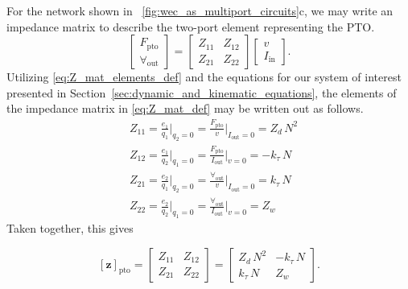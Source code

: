 \documentclass[lettersize,journal]{IEEEtran}
\begin{document}
For the network shown in \figurename~\ref{fig:wec_as_multiport_circuits}c, we may write an impedance matrix to describe the two-port element representing the PTO.
%
\begin{equation}
        \label{eq:Z_mat_def}
        \begin{bmatrix} 
                F_{\textrm{pto}} \\
                \forall_{\textrm{out}} 
        \end{bmatrix} 
        = 
        \begin{bmatrix} 
                Z_{11} & Z_{12} \\ 
                Z_{21} & Z_{22} 
        \end{bmatrix} 
        \begin{bmatrix} 
                v \\
                I_{\textrm{in}} 
        \end{bmatrix} .
\end{equation}
%
 Utilizing \eqref{eq:Z_mat_elements_def} and the equations for our system of interest presented in Section~\ref{sec:dynamic_and_kinematic_equations}, the elements of the impedance matrix in \eqref{eq:Z_mat_def} may be written out as follows.
%
\begin{subequations}
        \begin{align}
                &Z_{11} = \frac{e_1}{q_1} \bigg \vert_{q_2=0} 
                = \frac{F_{\textrm{pto}}}{v} \bigg \vert_{I_{\textrm{out}}=0} = Z_d \, N^2 \\[0.5em]
                &Z_{12} = \frac{e_1}{q_2} \bigg \vert_{q_1=0} 
                = \frac{F_{\textrm{pto}}}{I_{\textrm{out}}} \bigg \vert_{v=0} = -k_\tau \, N \\[0.5em]
                &Z_{21} = \frac{e_2}{q_1} \bigg \vert_{q_2=0} 
                = \frac{\forall_{\textrm{out}}}{v} \bigg \vert_{I_{\textrm{out}}=0} = k_\tau \, N \\[0.5em]
                &Z_{22} = \frac{e_2}{q_2} \bigg \vert_{q_1=0} 
                = \frac{\forall_{\textrm{out}}}{I_{\textrm{out}}} \bigg \vert_{v=0} = Z_w 
        \end{align}
\end{subequations}
%
Taken together, this gives 

 \begin{equation}
        \left[ \mathbf{z} \right]_{\textrm{pto}} 
        = 
        \begin{bmatrix} 
                Z_{11} & Z_{12} \\ 
                Z_{21} & Z_{22} 
        \end{bmatrix}
        =
        \begin{bmatrix} 
        Z_d \, N^2      & -k_\tau \, N  \\
        k_\tau \, N     & Z_w
        \end{bmatrix}.
        \label{eq:pto_impedance}
 \end{equation}
\end{document}
